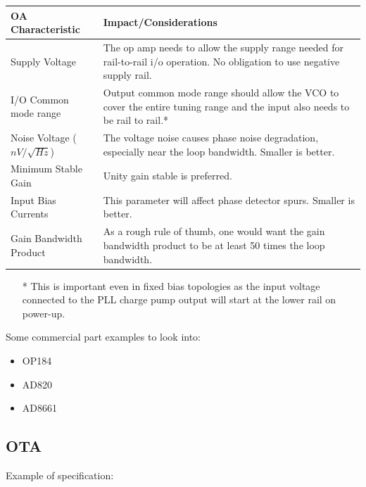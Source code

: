 \documentclass{article}
\begin{document}
\begin{table}[!ht]
    \centering
    \begin{tabular}{|l|p{100mm}|}
    \hline
		\rowcolor{LightCyan}
        OA Characteristic & Impact/Considerations \\ \hline
        Supply Voltage & The op amp needs to allow the supply range needed for rail-to-rail i/o operation. No obligation to use negative supply rail. \\ \hline
        I/O Common mode range & Output common mode range should allow the VCO to cover the entire tuning range and the input also needs to be rail to rail.* \\ \hline
        Noise Voltage ($nV/\sqrt{Hz}$) & The voltage noise causes phase noise degradation, especially near the loop bandwidth. Smaller is better. \\ \hline
        Minimum Stable Gain & Unity gain stable is preferred. \\ \hline
        Input Bias Currents & This parameter will affect phase detector spurs. Smaller is better. \\ \hline
        Gain Bandwidth Product & As a rough rule of thumb, one would want the gain bandwidth product to be at least 50 times the loop bandwidth. 
		\\ \hline
    \end{tabular}
\end{table}

\begin{itemize}
	\item [*] This is important even in fixed bias topologies as the input voltage connected to the PLL charge pump output will start at the lower rail on power-up.
\end{itemize}

Some commercial part examples to look into:
\begin{itemize}
	\item OP184
	\item AD820
	\item AD8661 
\end{itemize}

\subsection{OTA}

Example of specification:
\end{document}
